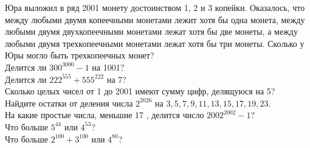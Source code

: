  Юра выложил в ряд 2001 монету достоинством 1, 2 и 3 копейки. Оказалось, что между любыми двумя копеечными монетами лежит хотя бы одна монета, между любыми двумя двухкопеечными монетами лежат хотя бы две монеты, а между любыми двумя трехкопеечными монетами лежат хотя бы три монеты. Сколько у Юры могло быть трехкопеечных монет?\\


  Делится ли $300^{3000}-1$ на 1001?\\

 Делится ли $222^{555}+555^{222}$ на 7?\\

 Сколько целых чисел от 1 до 2001 имеют сумму цифр, делящуюся на 5?\\

 Найдите остатки от деления числа $2^{2026}$ на $3,5,7,9,11,13,15,17,19,23$.\\

 На какие простые числа, меньшие 17 , делится число $2002^{2002}-1$?\\

 Что больше $5^{44}$ или $4^{53}$?\\

 Что больше $2^{100}+3^{100}$ или $4^{80}$?\\



